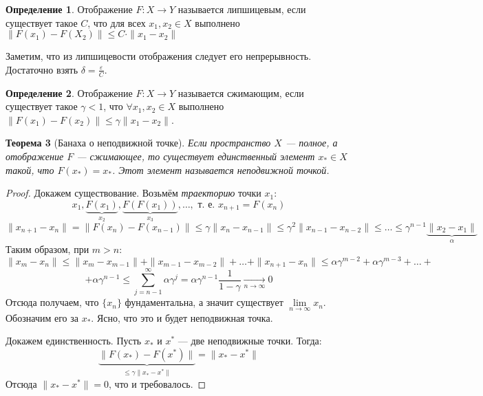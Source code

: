 \documentclass[11pt,openany,a4paper]{scrartcl}
\theoremstyle{plain}
\newtheorem{theorem}{Теорема}[subsection]
\theoremstyle{definition}
\newtheorem{definition}[theorem]{Определение}
\newcommand{\underto}[1]{\xrightarrow[#1]{}}
\begin{document}
\begin{definition}
    Отображение $F: X \to Y$ называется липшицевым, если существует такое $C$, что
    для всех $x_1, x_2 \in X$ выполнено $\|F(x_1) - F(X_2)\| \leqslant
    C\cdot\|x_1 - x_2\|$
\end{definition}

Заметим, что из липшицевости отображения следует его непрерывность. Достаточно 
взять $\delta = \frac{\varepsilon}{C}$.

\begin{definition}
    Отображение $F: X \to Y$ называется сжимающим, если существует такое
    $\gamma < 1$, что $\forall x_1, x_2 \in X$ выполнено $\|F(x_1) - F(x_2)\|
    \leqslant
    \gamma \|x_1 - x_2\|$.
\end{definition}

\begin{theorem}[Банаха о неподвижной точке]
    Если пространство $X$ — полное, а отображение $F$ — сжимающее, то существует
    единственный элемент $x_\ast \in X$ такой, что $F(x_\ast) = x_\ast$. Этот
    элемент называется неподвижной точкой.
\end{theorem}
\begin{proof}
    Докажем существование. Возьмём \emph{траекторию} точки $x_1$:
    $$
    x_1, \underbrace{F(x_1)}_{x_2}, \underbrace{F(F(x_1))}_{x_3}, \ldots,
    \text{ т. е. } x_{n+1} = F(x_n)
    $$
    $$
    \|x_{n+1} - x_n\| = \|F(x_n) - F(x_{n-1})\| \leqslant \gamma \|x_n - x_{n-1}\|
    \leqslant \gamma^2\|x_{n-1} - x_{n-2}\| \leqslant \ldots \leqslant
    \gamma^{n-1}\underbrace{\|x_2 - x_1\|}_{\alpha}
    $$
    Таким образом, при $m > n$:
    $$
    \|x_m - x_n\| \leqslant \|x_m - x_{m-1}\| + \|x_{m-1} - x_{m-2}\| + \ldots
    + \|x_{n+1} - x_n\| \leqslant \alpha\gamma^{m-2} + \alpha\gamma^{m-3} +\ldots +
    $$
    $$
    + \alpha\gamma^{n-1} \leqslant \sum\limits_{j = n-1}^\infty \alpha\gamma^j =
    \alpha\gamma^{n-1}\frac{1}{1-\gamma} \underto{n \to \infty} 0
    $$
    Отсюда получаем, что $\{x_n\}$ фундаментальна, а значит существует
    $\lim\limits_{n \to \infty} x_n$. Обозначим его за $x_\ast$. Ясно, что это
    и будет неподвижная точка.
    
    Докажем единственность. Пусть $x_\ast$ и $x^\ast$ — две неподвижные точки.
    Тогда:
    $$
    \underbrace{\|F(x_\ast) - F(x^\ast)\|}_{\leqslant \gamma\|x_\ast - x^\ast\|} =
    \|x_\ast - x^\ast\|
    $$
    Отсюда $\|x_\ast - x^\ast\| = 0$, что и требовалось.
\end{proof}
\end{document}
